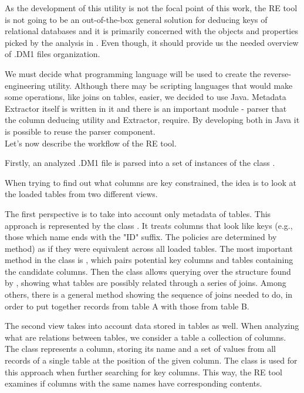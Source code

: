 As the development of this utility is not the focal point of this work, the RE tool is not going to be an out-of-the-box general solution for deducing keys of relational databases and it is primarily concerned with the objects and properties picked by the analysis in . Even though, it should provide us the needed overview of .DM1 files organization.

We must decide what programming language will be used to create the reverse-engineering utility. Although there may be scripting languages that would make some operations, like joins on tables, easier, we decided to use Java. Metadata Extractor itself is written in it and there is an important module - parser that the column deducing utility and Extractor, require. By developing both in Java it is possible to reuse the parser component. \\

Let's now describe the workflow of the RE tool.

Firstly, an analyzed .DM1 file is parsed into a set of instances of the class .

When trying to find out what columns are key constrained, the idea is to look at the loaded tables from two different views.

The first perspective is to take into account only metadata of tables. 
This approach is represented by the class . 
It treats columns that look like keys (e.g., those which name ends with the "ID" suffix. The policies are determined by  method) as if they were equivalent across all loaded tables.
The most important method in the class is , which pairs potential key columns and tables containing the candidate columns.
Then the class  allows querying over the structure found by , showing what tables are possibly related through a series of joins.
Among others, there is a general method  showing the sequence of joins needed to do, in order to put together records from table A with those from table B.

The second view takes into account data stored in tables as well. 
When analyzing what are relations between tables, we consider a table a collection of columns. The  class represents a column, storing its name and a set of values from all records of a single table at the position of the given column.
The  class is used for this approach when further searching for key columns.
This way, the RE tool examines if columns with the same names have corresponding contents.

